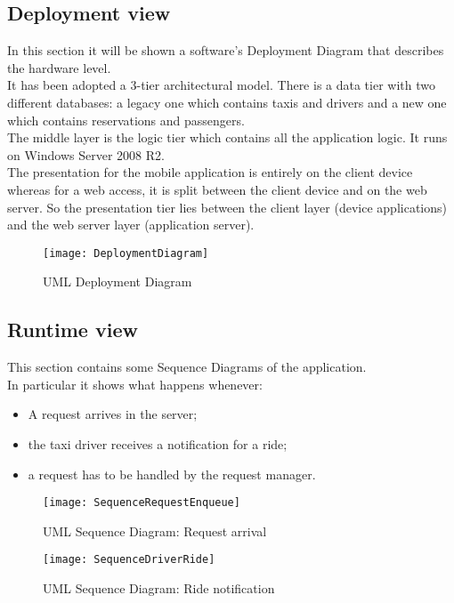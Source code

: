 \subsection{Deployment view}
In this section it will be shown a software's Deployment Diagram that describes the hardware level.\\
It has been adopted a 3-tier architectural model. There is a data tier with two different databases: a legacy one which contains taxis and drivers and a new one which contains reservations and passengers.\\
The middle layer is the logic tier which contains all the application logic. It runs on Windows Server 2008 R2.\\
The presentation for the mobile application is entirely on the client device whereas for a web access, it is split between the client device and on the web server. So the presentation tier lies between the client layer (device applications) and the web server layer (application server).

\begin{figure}[]
        \centering
        \texttt{[image: DeploymentDiagram]}
        \caption{UML Deployment Diagram}
        \label{fig:deployment}
\end{figure}

\newpage

\subsection{Runtime view}

This section contains some Sequence Diagrams of the application.\\
In particular it shows what happens whenever:
\begin{itemize}
\item A request arrives in the server;
\item the taxi driver receives a notification for a ride;
\item a request has to be handled by the request manager.
\end{itemize}

\begin{figure}[]
        \centering
        \texttt{[image: SequenceRequestEnqueue]}
        \caption{UML Sequence Diagram: Request arrival}
        \label{fig:enqueue}
\end{figure}

\begin{figure}[]
        \centering
        \texttt{[image: SequenceDriverRide]}
        \caption{UML Sequence Diagram: Ride notification}
        \label{fig:driverReq}
\end{figure}

